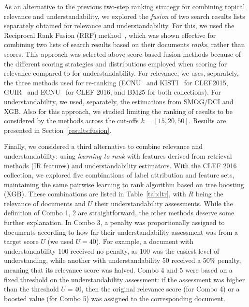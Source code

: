 As an alternative to the previous two-step ranking strategy for combining topical relevance and understandability, we explored the \textit{fusion} of two search results lists separately obtained for relevance and understandability. For this, we used the Reciprocal Rank Fusion (RRF) method~\cite{cormack09}, which was shown effective for combining two lists of search results based on their documents \textit{ranks}, rather than scores. This approach was selected above score-based fusion methods because of the different scoring strategies and distributions employed when scoring for relevance compared to for understandability. For relevance, we uses, separately, the three methods used for re-ranking (ECNU~\cite{song15} and KISTI~\cite{oh15} for CLEF2015, GUIR~\cite{soldaini16} and ECNU~\cite{song16} for CLEF 2016, and BM25 for both collections). For understandability, we used, separately, the estimations from SMOG/DCI and XGB. Also for this approach, we studied limiting the ranking of results to be considered by the methods across the cut-offs $k=[15, 20, 50]$. Results are presented in Section~\ref{results:fusion}.



Finally, we considered a third alternative to combine relevance and understandability: using \textit{learning to rank} with features derived from retrieval methods (IR features) and understandability estimators.
With the CLEF 2016 collection, we explored five combinations of label attribution and feature sets, maintaining the same pairwise learning to rank algorithm based on tree boosting (XGB).
These combinations are listed in Table~\ref{tab:ltr}, with $R$ being the relevance of documents and $U$ their understandability assessments. While the definition of Combo 1, 2 are straightforward, the other methods deserve some further explanation. In Combo 3, a penalty was proportionally assigned to documents according to how far their understandability assessment was from a target score $U$ (we used $U=40$). For example, a document with understandability 100 received no penalty, as 100 was the easiest level of understanding, while another with understandability 50 received a 50\% penalty, meaning that its relevance score was halved. Combo 4 and 5 were based on a fixed threshold on the understandability assessment: if the assessment was higher than the threshold $U=40$, then the original relevance score (for Combo 4) or a boosted value (for Combo 5) was assigned to the corresponding document.


